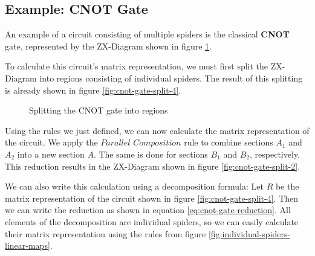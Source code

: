 \subsection{Example: CNOT Gate}

An example of a circuit consisting of multiple spiders is the classical \textbf{CNOT} gate, represented by the ZX-Diagram shown in figure \ref{fig:cnot-gate-split}.

To calculate this circuit's matrix representation, we must first split the ZX-Diagram into regions consisting of individual spiders. The result of this splitting is already shown in figure \ref{fig:cnot-gate-split-4}.

\begin{figure}
    \centering
    \qquad
    \caption{Splitting the CNOT gate into regions}
    \label{fig:cnot-gate-split}
\end{figure}

Using the rules we just defined, we can now calculate the matrix representation of the circuit. We apply the $\textit{Parallel Composition}$ rule to combine sections $A_1$ and $A_2$ into a new section $A$. The same is done for sections $B_1$ and $B_2$, respectively. This reduction results in the ZX-Diagram shown in figure \ref{fig:cnot-gate-split-2}.

We can also write this calculation using a decomposition formula: Let $R$ be the matrix representation of the circuit shown in figure \ref{fig:cnot-gate-split-4}. Then we can write the reduction as shown in equation \ref{eq:cnot-gate-reduction}. All elements of the decomposition are individual spiders, so we can easily calculate their matrix representation using the rules from figure \ref{fig:individual-spiders-linear-maps}.


